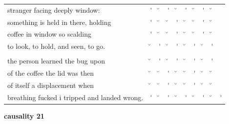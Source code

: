 \documentclass[12pt, landscape]{article}
\begin{document}
\begin{center}
\begin{tabularx}{\textwidth}{
>{\lefting\arraybackslash}X
c
c
c
c
c
c
c
c
c
}

stranger facing deeply window: & \'{} & \u{} & \'{} & \u{} & \'{} & \u{} & \'{} & \u{} & \\
something is held in there, holding & \'{} & \u{} & \u{} & \'{} & \u{} & \u{} & \'{} & \u{} & \\
coffee in window so scalding & \'{} & \u{} & \u{} & \'{} & \u{} & \u{} & \'{} & \u{} & \\
to look, to hold, and seen, to go. & \u{} & \'{} & \u{} & \'{} & \u{} & \'{} & \u{} & \'{} & \\
 & & & & & & & & \\
the person learned the bug upon & \u{} & \'{} & \u{} & \'{} & \u{} & \'{} & \u{} & \'{} & \\
of the coffee the lid was then & \u{} & \u{} & \'{} & \u{} & \u{} & \'{} & \u{} & \u{} & \\
of itself a displacement when & \u{} & \u{} & \'{} & \u{} & \u{} & \'{} & \u{} & \u{} & \\
breathing fucked i tripped and landed wrong. & \'{} & \u{} & \'{} & \u{} & \'{} & \u{} & \'{} & \u{} & \'{} \\

\end{tabularx}
\end{center}

\vspace*{\fill}

\newpage

\vspace*{\fill}

\noindent \textbf{causality 21}
\noindent \hfill \par
\end{document}
